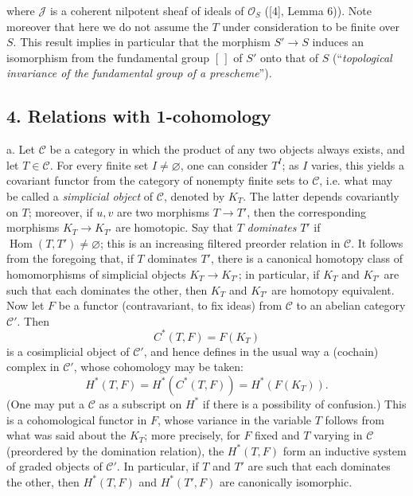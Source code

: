 where $\mathcal J$ is a coherent nilpotent sheaf of ideals of $\mathcal O_S$
([4], Lemma 6)). Note moreover that here we do not assume the $T$ under
consideration to be finite over $S$. This result implies in particular that the
morphism $S'\longrightarrow S$ induces an isomorphism from the fundamental
group $[\,]$ of $S'$ onto that of $S$ (“\emph{topological invariance of the
fundamental group of a prescheme}”).

\subsection*{4. Relations with 1-cohomology}

\medskip\noindent
a. Let $\mathcal C$ be a category in which the product of any two objects
always exists, and let $T\in\mathcal C$. For every finite set
$I\ne\varnothing$, one can consider $T^I$; as $I$ varies, this yields a
covariant functor from the category of nonempty finite sets to $\mathcal C$,
i.e. what may be called a \emph{simplicial object} of $\mathcal C$, denoted by
$K_T$. The latter depends covariantly on $T$; moreover, if $u,v$ are two
morphisms $T\longrightarrow T'$, then the corresponding morphisms
$K_T\longrightarrow K_{T'}$ are homotopic. Say that $T$ \emph{dominates} $T'$
if $\operatorname{Hom}(T,T')\ne\varnothing$; this is an increasing filtered
preorder relation in $\mathcal C$. It follows from the foregoing that, if $T$
dominates $T'$, there is a canonical homotopy class of homomorphisms of
simplicial objects $K_T\longrightarrow K_{T'}$; in particular, if $K_T$ and
$K_{T'}$ are such that each dominates the other, then $K_T$ and $K_{T'}$ are
homotopy equivalent. Now let $F$ be a functor (contravariant, to fix ideas) from
$\mathcal C$ to an abelian category $\mathcal C'$. Then
\[
  C^*(T,F)=F(K_T)
\]
is a cosimplicial object of $\mathcal C'$, and hence defines in the usual way a
(cochain) complex in $\mathcal C'$, whose cohomology may be taken:
\[
  H^*(T,F)=H^*(C^*(T,F))=H^*(F(K_T)).
\]
(One may put a $\mathcal C$ as a subscript on $H^*$ if there is a possibility
of confusion.) This is a cohomological functor in $F$, whose variance in the
variable $T$ follows from what was said about the $K_T$; more precisely, for
$F$ fixed and $T$ varying in $\mathcal C$ (preordered by the domination
relation), the $H^*(T,F)$ form an inductive system of graded objects of
$\mathcal C'$. In particular, if $T$ and $T'$ are such that each dominates the
other, then $H^*(T,F)$ and $H^*(T',F)$ are canonically isomorphic.

